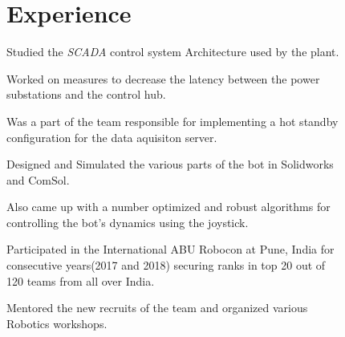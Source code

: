 \documentclass[]{limos-resume-openfont}
\begin{document}
\hfill
\begin{minipage}[t]{0.66\textwidth} 


\section{Experience}

\vspace{\topsep} %
\begin{tightemize}
\item Studied the \textit{SCADA} control system Architecture used by the plant.
\item Worked on measures to decrease the latency between the power \\substations and the control hub.
\item Was a part of the team responsible for implementing a hot standby\\ configuration for the data aquisiton server.
\end{tightemize}
\sectionsep

\begin{tightemize}
\item Designed and Simulated the various parts of the bot in Solidworks \\and ComSol.
\item Also came up with a number optimized and robust algorithms for \\controlling the bot's dynamics using the joystick.
\item Participated in the International ABU Robocon at Pune, India for\\ consecutive years(2017 and 2018) securing ranks in top 20 out of \\120 teams from all over India.
\item Mentored the new recruits of the team and organized various\\
Robotics workshops.
\end{tightemize}
\sectionsep



\end{minipage}
\end{document}
